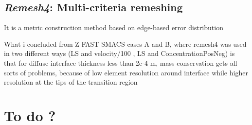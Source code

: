 \subsection{\emph{Remesh4}: Multi-criteria remeshing}
It is a metric construction method based on edge-based error distribution

What i concluded from Z-FAST-SMACS cases A and B, where remesh4 was used in two different ways (LS and velocity/100  ,  LS and ConcentrationPosNeg)
is that for diffuse interface thickness less than 2e-4 m, mass conservation gets all sorts of problems, because of low element resolution 
around interface while higher resolution at the tips of the transition region


\section*{To do ?}

















